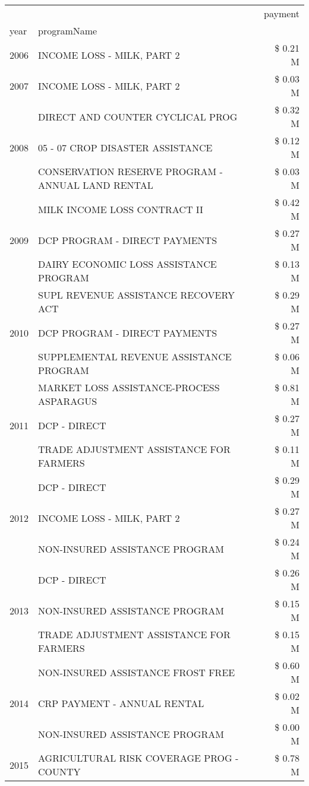 \begin{tabular}{llr}
\toprule
 &  & payment \\
year & programName &  \\
\midrule
2006 & INCOME LOSS - MILK, PART 2 & \$ 0.21 M \\
\cline{1-3}
2007 & INCOME LOSS - MILK, PART 2 & \$ 0.03 M \\
\cline{1-3}
\multirow[t]{3}{*}{2008} & DIRECT AND COUNTER CYCLICAL PROG & \$ 0.32 M \\
 & 05 - 07 CROP DISASTER ASSISTANCE & \$ 0.12 M \\
 & CONSERVATION RESERVE PROGRAM - ANNUAL LAND RENTAL & \$ 0.03 M \\
\cline{1-3}
\multirow[t]{3}{*}{2009} & MILK INCOME LOSS CONTRACT II & \$ 0.42 M \\
 & DCP PROGRAM - DIRECT PAYMENTS & \$ 0.27 M \\
 & DAIRY ECONOMIC LOSS ASSISTANCE PROGRAM & \$ 0.13 M \\
\cline{1-3}
\multirow[t]{3}{*}{2010} & SUPL REVENUE ASSISTANCE RECOVERY ACT & \$ 0.29 M \\
 & DCP PROGRAM - DIRECT PAYMENTS & \$ 0.27 M \\
 & SUPPLEMENTAL REVENUE ASSISTANCE PROGRAM & \$ 0.06 M \\
\cline{1-3}
\multirow[t]{3}{*}{2011} & MARKET LOSS ASSISTANCE-PROCESS ASPARAGUS & \$ 0.81 M \\
 & DCP - DIRECT & \$ 0.27 M \\
 & TRADE ADJUSTMENT ASSISTANCE FOR FARMERS & \$ 0.11 M \\
\cline{1-3}
\multirow[t]{3}{*}{2012} & DCP - DIRECT & \$ 0.29 M \\
 & INCOME LOSS - MILK, PART 2 & \$ 0.27 M \\
 & NON-INSURED ASSISTANCE PROGRAM & \$ 0.24 M \\
\cline{1-3}
\multirow[t]{3}{*}{2013} & DCP - DIRECT & \$ 0.26 M \\
 & NON-INSURED ASSISTANCE PROGRAM & \$ 0.15 M \\
 & TRADE ADJUSTMENT ASSISTANCE FOR FARMERS & \$ 0.15 M \\
\cline{1-3}
\multirow[t]{3}{*}{2014} & NON-INSURED ASSISTANCE FROST FREE & \$ 0.60 M \\
 & CRP PAYMENT - ANNUAL RENTAL & \$ 0.02 M \\
 & NON-INSURED ASSISTANCE PROGRAM & \$ 0.00 M \\
\cline{1-3}
\multirow[t]{3}{*}{2015} & AGRICULTURAL RISK COVERAGE PROG - COUNTY & \$ 0.78 M \\

\end{tabular}
